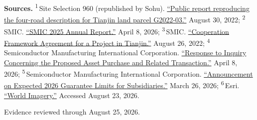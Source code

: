 \begin{minipage}[t][0.90\textheight][t]{\textwidth}
{\sffamily\scriptsize\setlength{\emergencystretch}{1.5em}\textbf{Sources.} \textsuperscript{1}\,Site Selection 960 (republished by Sohu). \href{\detokenize{https://www.sohu.com/a/581126452_121123526}}{\enquote{Public report reproducing the four-road description for Tianjin land parcel G2022-03.}} August 30, 2022; \textsuperscript{2}\,SMIC. \href{\detokenize{https://www1.hkexnews.hk/listedco/listconews/sehk/2026/0408/2026040801181.pdf}}{\enquote{SMIC 2025 Annual Report.}} April 8, 2026; \textsuperscript{3}\,SMIC. \href{\detokenize{https://www1.hkexnews.hk/listedco/listconews/sehk/2022/0826/2022082601080.pdf}}{\enquote{Cooperation Framework Agreement for a Project in Tianjin.}} August 26, 2022; \textsuperscript{4}\,Semiconductor Manufacturing International Corporation. \href{\detokenize{https://www1.hkexnews.hk/listedco/listconews/sehk/2026/0408/2026040802776_c.pdf}}{\enquote{Response to Inquiry Concerning the Proposed Asset Purchase and Related Transaction.}} April 8, 2026; \textsuperscript{5}\,Semiconductor Manufacturing International Corporation. \href{\detokenize{https://www.hkexnews.hk/listedco/listconews/sehk/2026/0326/2026032601650_c.pdf}}{\enquote{Announcement on Expected 2026 Guarantee Limits for Subsidiaries.}} March 26, 2026; \textsuperscript{6}\,Esri. \href{\detokenize{https://www.arcgis.com/home/item.html?id=10df2279f9684e4a9f6a7f08febac2a9}}{\enquote{World Imagery.}} Accessed August 23, 2026.\par}
\vfill
\noindent{\color{hairline}\rule{\linewidth}{0.4pt}}\par\smallskip
{\sffamily\scriptsize\color{black!58} Evidence reviewed through August 25, 2026.\par}
\end{minipage}
\clearpage
